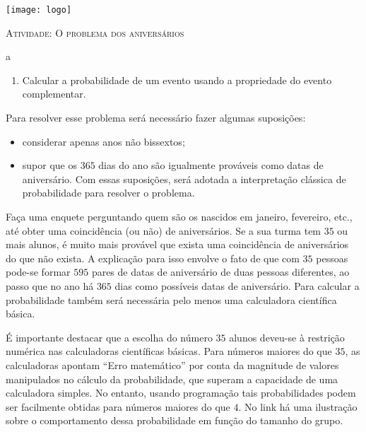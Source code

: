 \documentclass[10 pt,usenames,dvipsnames, oneside]{article}
\begin{document}
\begin{center}
  \begin{minipage}[l]{3cm}
\texttt{[image: logo]}    
\end{minipage}\hfill
\begin{minipage}[r]{.8\textwidth}
 {\Large \scshape Atividade: O problema dos aniversários}  
\end{minipage}
\end{center}
\vspace{.2cm}

\ifdefined\prof
\begin{objetivos}
\item a
\end{objetivos}

\begin{goals}
\begin{enumerate}
\item Calcular a probabilidade de um evento usando a propriedade do evento complementar.
\end{enumerate}

\tcblower

Para resolver esse problema será necessário fazer algumas suposições: 
\begin{itemize}
\item considerar apenas anos não bissextos; 
\item supor que os $365$ dias do ano são igualmente prováveis como datas de aniversário. Com essas suposições, será adotada a interpretação clássica de probabilidade para resolver o problema.
\end{itemize}

Faça uma enquete perguntando quem são os nascidos em janeiro, fevereiro, etc., até obter uma coincidência (ou não) de aniversários. Se a sua turma tem $35$ ou mais alunos, é muito mais provável que exista uma coincidência de aniversários do que não exista. A explicação para isso envolve o fato de que com $35$ pessoas pode-se formar $595$ pares de datas de aniversário de duas pessoas diferentes, ao passo que no ano há $365$ dias como possíveis datas de aniversário. Para calcular a probabilidade também será necessária pelo menos uma calculadora científica básica.

É importante destacar que a escolha do número $35$ alunos deveu-se à restrição numérica nas calculadoras científicas básicas. Para números maiores do que $35$, as calculadoras apontam “Erro matemático”{} por conta da magnitude de valores manipulados no cálculo da probabilidade, que superam a capacidade de uma calculadora simples. No entanto, usando programação tais probabilidades podem ser facilmente obtidas para números maiores do que $4$. No link há uma ilustração sobre o comportamento dessa probabilidade em função do tamanho do grupo.
\end{goals}
\end{document}
